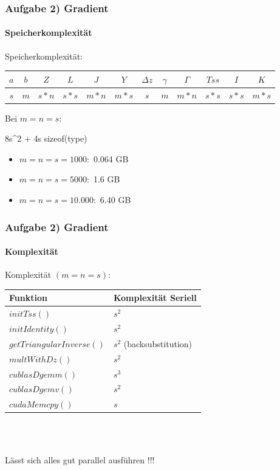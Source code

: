\begin{frame}
	\frametitle{Aufgabe 2) Gradient}
	\framesubtitle{Speicherkomplexität}
	Speicherkomplexität: \\
	\begin{center}
		\begin{tabular}{ c | c | c | c | c | c | c | c | c | c | c | c }
			$a$ & $b$ & $Z$ & $L$ & $J$ & $Y$ & $\Delta z$ & $\gamma$ & $\Gamma$ & $Tss$ & $I$ & $K$\\
			\hline
			$s$ & $m$ & $s*n$ & $s*s$ & $m*n$ & $m*s$ & $s$ & $m$ & $m*n$& $s*s$ & $s*s$ & $m*s$\\
		\end{tabular}
	\end{center}
	Bei $m=n=s$:
	\begin{flalign*}
		8s^2 + 4s \times sizeof(type)
	\end{flalign*}
	\begin{itemize}
		\item $m=n=s=1000:$  0.064 GB
		\item $m=n=s=5000:$ 1.6 GB
		\item $m=n=s=10.000:$ 6.40 GB
	\end{itemize}
\end{frame}
\begin{frame}
	\frametitle{Aufgabe 2) Gradient}
	\framesubtitle{Komplexität}
	Komplexität $(m=n=s)$: \\
	\begin{center}
		\begin{tabular}{ l | l}
			Funktion & Komplexität Seriell \\
			\hline
			$initTss()$	& $s^2$\\
			$initIdentity()$& $s^2$ \\
			$getTriangularInverse()$& $s^2$ (backsubstitution)\\
			$multWithDz()$  & $s^2$  \\
			$cublasDgemm()$& $s^3$ \\
			$cublasDgemv()$ & $s^2$ \\
			$cudaMemcpy()$ & $s$ \\
		\end{tabular} 	\\~\\
	\end{center}
	Lässt sich alles gut parallel ausführen !!!
\end{frame}
